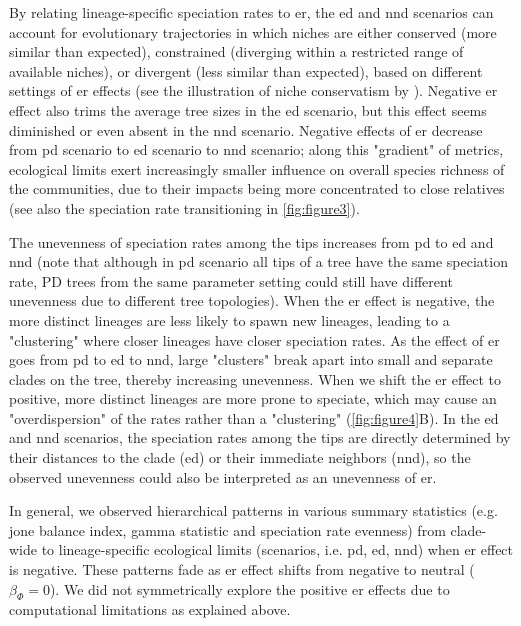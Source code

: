 {By relating lineage-specific speciation rates to \acrshort{er}, the \acrshort{ed} and \acrshort{nnd} scenarios can account for evolutionary trajectories in which niches are either conserved (more similar than expected), constrained (diverging within a restricted range of available niches), or divergent (less similar than expected), based on different settings of \acrshort{er} effects (see the illustration of niche conservatism by \citet{pyron_phylogenetic_2015}). Negative \acrshort{er} effect also trims the average tree sizes in the \acrshort{ed} scenario, but this effect seems diminished or even absent in the \acrshort{nnd} scenario. Negative effects of \acrshort{er} decrease from \acrshort{pd} scenario to \acrshort{ed} scenario to \acrshort{nnd} scenario; along this "gradient" of metrics, ecological limits exert increasingly smaller influence on overall species richness of the communities, due to their impacts being more concentrated to close relatives (see also the speciation rate transitioning in \autoref{fig:figure3}).

The unevenness of speciation rates among the tips increases from \acrshort{pd} to \acrshort{ed} and \acrshort{nnd} (note that although in \acrshort{pd} scenario all tips of a tree have the same speciation rate, PD trees from the same parameter setting could still have different unevenness due to different tree topologies). When the \acrshort{er} effect is negative, the more distinct lineages are less likely to spawn new lineages, leading to a "clustering" where closer lineages have closer speciation rates. As the effect of \acrshort{er} goes from \acrshort{pd} to \acrshort{ed} to \acrshort{nnd}, large "clusters" break apart into small and separate clades on the tree, thereby increasing unevenness. When we shift the \acrshort{er} effect to positive, more distinct lineages are more prone to speciate, which may cause an "overdispersion" of the rates rather than a "clustering" (\autoref{fig:figure4}B). In the \acrshort{ed} and \acrshort{nnd} scenarios, the speciation rates among the tips are directly determined by their distances to the clade (\acrshort{ed}) or their immediate neighbors (\acrshort{nnd}), so the observed unevenness could also be interpreted as an unevenness of \acrshort{er}. 

In general, we observed hierarchical patterns in various summary statistics (e.g. \acrshort{jone} balance index, \acrshort{gamma} statistic and speciation rate evenness) from clade-wide to lineage-specific ecological limits (scenarios, i.e. \acrshort{pd}, \acrshort{ed}, \acrshort{nnd}) when \acrshort{er} effect is negative. These patterns fade as \acrshort{er} effect shifts from negative to neutral ($\beta_\varPhi = 0$). We did not symmetrically explore the positive \acrshort{er} effects due to computational limitations as explained above.

}
